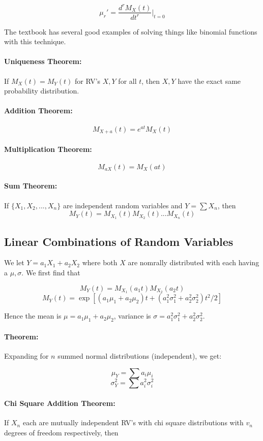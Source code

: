 \documentclass[a4paper,12pt]{report}
\begin{document}
$$\mu_r' = \frac{d^r M_X(t)}{dt^r}|_{t=0}$$

The textbook has several good examples of solving things like binomial functions with this technique.

\paragraph{Uniqueness Theorem: } If $M_X(t) = M_Y(t)$ for RV's $X, Y$ for all $t$, then $X, Y$ have the exact same probability distribution.

\paragraph{Addition Theorem: } $$M_{X+a}(t) = e^{at}M_X(t)$$

\paragraph{Multiplication Theorem: } $$M_{aX}(t) = M_X(at)$$

\paragraph{Sum Theorem: } If $\{X_1, X_2, ..., X_n\}$ are independent random variables and $Y = \sum X_n$, then $$M_Y(t) = M_{X_1}(t)M_{X_2}(t)...M_{X_n}(t)$$

\subsection{Linear Combinations of Random Variables}

We let $Y = a_1X_1 + a_2X_2$ where both $X$ are nomrally distributed with each having a $\mu, \sigma$. We first find that 

$$M_Y(t) = M_{X_1}(a_1t)M_{X_2}(a_2t)$$
$$M_Y(t) = \exp[(a_1\mu_1 + a_2\mu_2) t + (a_1^2\sigma_1^2 + a_2^2 \sigma_2^2)t^2/2]$$

Hence the mean is $\mu = a_1\mu_1 + a_2 \mu_2$, variance is $\sigma = a_1^2 \sigma_1^2 + a_2^2 \sigma_2^2$. 


\paragraph{Theorem: } Expanding for $n$ summed normal distributions (independent), we get: 

$$\mu_Y = \sum a_i\mu_i$$
$$\sigma_Y^2 = \sum a_i^2 \sigma_i^2$$

\paragraph{Chi Square Addition Theorem: } If $X_n$ each are mutually independent RV's with chi square distributions with $v_n$ degrees of freedom respectively, then 
\end{document}
